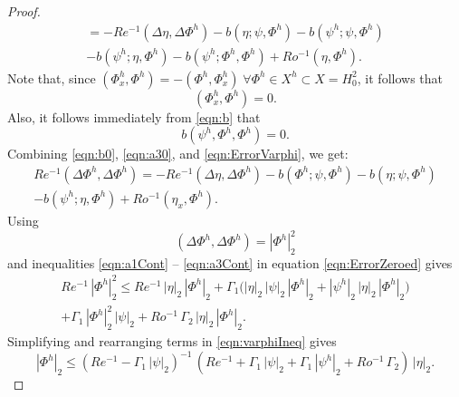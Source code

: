\begin{proof}
\begin{equation}
\begin{split}
        = -Re^{-1} (\Delta \eta, \Delta \Phi^h)
        - b(\eta;\psi,\Phi^h) - b(\psi^h;\psi,\Phi^h) \\
      - b(\psi^h;\eta,\Phi^h) - b(\psi^h;\Phi^h,\Phi^h)
        + Ro^{-1} (\eta,\Phi^h).
    \end{split}
    \label{eqn:ErrorVarphi}
  \end{equation}
  Note that, since $(\Phi^h_x,\Phi^h)=-(\Phi^h,\Phi^h_x)\; \forall
  \Phi^h \in X^h \subset X = H^2_0$, it follows that
  \begin{equation}
    (\Phi^h_x,\Phi^h)=0 .
    \label{eqn:a30}
  \end{equation}
  Also, it follows immediately from \eqref{eqn:b} that
  \begin{equation}
    b(\psi^h,\Phi^h,\Phi^h)=0 .
    \label{eqn:b0}
  \end{equation}
  Combining \eqref{eqn:b0}, \eqref{eqn:a30}, and \eqref{eqn:ErrorVarphi}, we get:
  \begin{equation}
    \begin{split}
      Re^{-1} (\Delta \Phi^h, \Delta \Phi^h) = -Re^{-1} (\Delta \eta, \Delta \Phi^h)
        - b(\Phi^h;\psi,\Phi^h) - b(\eta;\psi,\Phi^h) \\
      - b(\psi^h;\eta,\Phi^h) + Ro^{-1} (\eta_x,\Phi^h).
    \end{split}
    \label{eqn:ErrorZeroed}
  \end{equation}
  Using
  \begin{equation*}
    (\Delta \Phi^h, \Delta \Phi^h) = |\Phi^h|^2_2
  \end{equation*}
  and inequalities \eqref{eqn:a1Cont} -- \eqref{eqn:a3Cont} in equation
  \eqref{eqn:ErrorZeroed} gives
  \begin{equation}
    \begin{split}
      Re^{-1} \, |\Phi^h|^2_2 \le Re^{-1} \,  |\eta|_2 \, |\Phi^h|_2 + \Gamma_1
        \biggl( |\eta|_2 \, |\psi|_2 \, |\Phi^h|_2 + |\psi^h|_2 \, |\eta|_2 \,
          |\Phi^h|_2 \biggr) \\
      + \Gamma_1 \, |\Phi^h|^2_2 \, |\psi|_2 + Ro^{-1}\, \Gamma_2 \, |\eta|_2 \, |\Phi^h|_2 .
    \end{split}
    \label{eqn:varphiIneq}
  \end{equation}
  Simplifying and rearranging terms in \eqref{eqn:varphiIneq} gives
  \begin{equation}
      |\Phi^h|_2 \le \left( Re^{-1} - \Gamma_1 \, | \psi |_2 \right)^{-1} \,
        \left( Re^{-1} + \Gamma_1 \, |\psi|_2 + \Gamma_1 \, |\psi^h|_2 +
        Ro^{-1}\, \Gamma_2 \right) \, |\eta|_2 .

\end{equation}
\end{proof}

